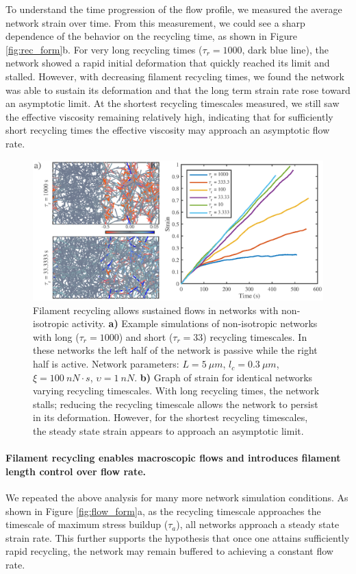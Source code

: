 \documentclass[10pt,letterpaper]{article}
\begin{document}
To understand the time progression of the flow profile, we measured the average network strain over time.  From this measurement, we could see a sharp dependence of the behavior on the recycling time, as shown in Figure \ref{fig:rec_form}b.  For very long recycling times ($\tau_r=1000$, dark blue line), the network showed a rapid initial deformation that quickly reached its limit and stalled.  However, with decreasing filament recycling times, we found the network was able to sustain its deformation and that the long term strain rate rose toward an asymptotic limit.  At the shortest recycling timescales measured, we still saw the effective viscosity remaining relatively high, indicating that for sufficiently short recycling times the effective viscosity may approach an asymptotic flow rate.

\begin{figure}[h!]
\centering
\includegraphics[width=\hsize]{figures/figure6a}
\caption{\label{fig:flow_ex}  Filament recycling allows sustained flows in networks with non-isotropic activity. \textbf{a)} Example simulations of non-isotropic networks with long ($\tau_r=1000$) and short ($\tau_r=33$) recycling timescales. In these networks the left half of the network is passive while the right half is active.  Network parameters: $L=5\: \mu m$, $l_c=0.3\: \mu m$, $\xi=100\: nN\cdot s$, $\upsilon=1\: nN$. \textbf{b)} Graph of strain for identical networks varying recycling timescales.  With long recycling times, the network stalls; reducing the recycling timescale allows the network to persist in its deformation.  However, for the shortest recycling timescales, the steady state strain appears to approach an asymptotic limit. }
\end{figure}

\paragraph{Filament recycling enables macroscopic flows and introduces filament length control over flow rate.}
We repeated the above analysis for many more network simulation conditions. As shown in Figure \ref{fig:flow_form}a, as the recycling timescale approaches the timescale of maximum stress buildup ($\tau_a$), all networks approach a steady state strain rate.  This further supports the hypothesis that once one attains sufficiently rapid recycling, the network may remain buffered to achieving a constant flow rate.
\end{document}
